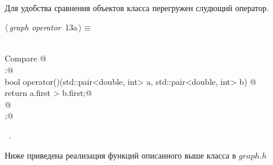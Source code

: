 \documentclass[12pt]{article}
\begin{document}
\paragraph{}
Для удобства сравнения объектов класса перегружен слудющий оператор.
\begin{flushleft} \small
\begin{minipage}{\linewidth}\label{scrap20}\raggedright\small
{} $\langle\,${\itshape graph operator}\nobreak\ {\footnotesize {13a}}$\,\rangle\equiv$
\vspace{-1ex}
\begin{list}{}{} \item
\mbox{}\verb@@\\
\mbox{}\verb@class Compare {@\\
\mbox{}\verb@public:@\\
\mbox{}\verb@    bool operator()(std::pair<double, int> a, std::pair<double, int> b) {@\\
\mbox{}\verb@        return a.first > b.first;@\\
\mbox{}\verb@    }@\\
\mbox{}\verb@};@\\
\mbox{}\verb@@{\NWsep}
\end{list}
\vspace{-1.5ex}
\footnotesize
\begin{list}{}{\setlength{\itemsep}{-\parsep}\setlength{\itemindent}{-\leftmargin}}
\item \NWtxtMacroRefIn\ .

\item{}
\end{list}
\end{minipage}\vspace{4ex}
\end{flushleft}
Ниже приведена реализация функций описанного выше класса в $graph.h$
\end{document}
